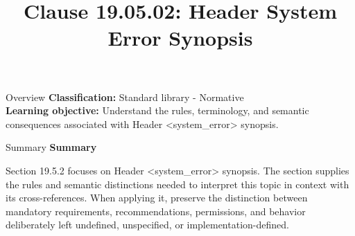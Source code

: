 \documentclass[10pt,letterpaper]{article}
\title{Clause 19.05.02: Header System Error Synopsis}
\author{}
\date{}
\begin{document}
\maketitle
\begin{CornellOverviewBox}{Overview}
\textbf{Classification:} Standard library - Normative\\[2pt]
\textbf{Learning objective:} Understand the rules, terminology, and semantic consequences associated with Header <system\_error> synopsis.
\end{CornellOverviewBox}\begin{CornellSummaryBox}{Summary}
{\sffamily\bfseries\color{Accent} Summary}\par\vspace{3pt}Section 19.5.2 focuses on Header <system\_error> synopsis. The section supplies the rules and semantic distinctions needed to interpret this topic in context with its cross-references. When applying it, preserve the distinction between mandatory requirements, recommendations, permissions, and behavior deliberately left undefined, unspecified, or implementation-defined.
\end{CornellSummaryBox}
\end{document}

